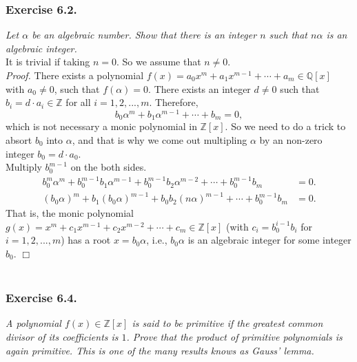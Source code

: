 \documentclass{article}
\begin{document}



\subsubsection*{Exercise 6.2.}
\emph{Let $\alpha$ be an algebraic number.
Show that there is an integer $n$ such that $n\alpha$ is an algebraic integer.} \\

It is trivial if taking $n = 0$. So we assume that $n \neq 0$. \\

\emph{Proof.}
There exists a polynomial
$f(x) = a_0 x^m + a_1 x^{m-1} + \cdots + a_m \in \mathbb{Q}[x]$ with $a_0 \neq 0$,
such that $f(\alpha) = 0$.
There exists an integer $d \neq 0$ such that
$b_i = d \cdot a_i \in \mathbb{Z}$ for all $i = 1, 2, ..., m$.
Therefore,
$$b_0 \alpha^m + b_1 \alpha^{m-1} + \cdots + b_m = 0,$$
which is not necessary a monic polynomial in $\mathbb{Z}[x]$.
So we need to do a trick to absort $b_0$ into $\alpha$,
and that is why we come out multipling $\alpha$ by an non-zero integer
$b_0 = d \cdot a_0$. \\

Multiply $b_0^{m-1}$ on the both sides.
\begin{align*}
b_0^m \alpha^m + b_0^{m-1} b_1 \alpha^{m-1} + b_0^{m-1} b_2 \alpha^{m-2}
+ \cdots + b_0^{m-1} b_m &= 0. \\
(b_0\alpha)^m + b_1 (b_0\alpha)^{m-1} + b_0 b_2 (n\alpha)^{m-1}
+ \cdots + b_0^{m-1} b_m &= 0.
\end{align*}
That is, the monic polynomial
$g(x) = x^m + c_1 x^{m-1} + c_2 x^{m-2} + \cdots + c_m \in \mathbb{Z}[x]$
(with $c_i = b_0^{i - 1} b_i$ for $i = 1, 2, ..., m$)
has a root $x = b_0\alpha$, i.e.,
$b_0\alpha$ is an algebraic integer for some integer $b_0$.
$\Box$ \\\\






\subsubsection*{Exercise 6.4.}
\emph{A polynomial $f(x) \in \mathbb{Z}[x]$ is said to be primitive
if the greatest common divisor of its coefficients is $1$.
Prove that the product of primitive polynomials is again primitive.
This is one of the many results knows as Gauss' lemma.} \\
\end{document}
